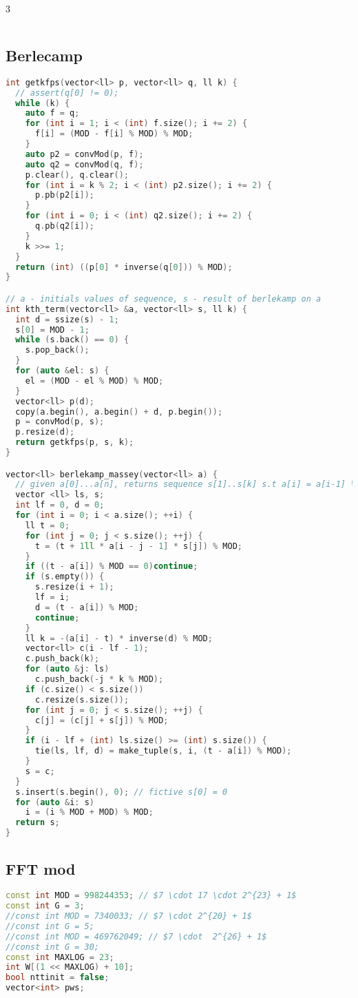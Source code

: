 \documentclass[9pt,a4paper,landscape,twosided]{extarticle}
\begin{document}
\begin{multicols*}{3}
\begin{lstlisting}[language=C++]
\end{lstlisting}

\subsection{Berlecamp}
\begin{lstlisting}[language=C++]
int getkfps(vector<ll> p, vector<ll> q, ll k) {
  // assert(q[0] != 0);
  while (k) {
    auto f = q;
    for (int i = 1; i < (int) f.size(); i += 2) {
      f[i] = (MOD - f[i] % MOD) % MOD;
    }
    auto p2 = convMod(p, f);
    auto q2 = convMod(q, f);
    p.clear(), q.clear();
    for (int i = k % 2; i < (int) p2.size(); i += 2) {
      p.pb(p2[i]);
    }
    for (int i = 0; i < (int) q2.size(); i += 2) {
      q.pb(q2[i]);
    }
    k >>= 1;
  }
  return (int) ((p[0] * inverse(q[0])) % MOD);
}

// a - initials values of sequence, s - result of berlekamp on a
int kth_term(vector<ll> &a, vector<ll> s, ll k) {
  int d = ssize(s) - 1;
  s[0] = MOD - 1;
  while (s.back() == 0) {
    s.pop_back();
  }
  for (auto &el: s) {
    el = (MOD - el % MOD) % MOD;
  }
  vector<ll> p(d);
  copy(a.begin(), a.begin() + d, p.begin());
  p = convMod(p, s);
  p.resize(d);
  return getkfps(p, s, k);
}

vector<ll> berlekamp_massey(vector<ll> a) {
  // given a[0]...a[n], returns sequence s[1]..s[k] s.t a[i] = a[i-1] \cdot s[1] + \ldots + a[i-k] \cdot s[k]
  vector <ll> ls, s;
  int lf = 0, d = 0;
  for (int i = 0; i < a.size(); ++i) {
    ll t = 0;
    for (int j = 0; j < s.size(); ++j) {
      t = (t + 1ll * a[i - j - 1] * s[j]) % MOD;
    }
    if ((t - a[i]) % MOD == 0)continue;
    if (s.empty()) {
      s.resize(i + 1);
      lf = i;
      d = (t - a[i]) % MOD;
      continue;
    }
    ll k = -(a[i] - t) * inverse(d) % MOD;
    vector<ll> c(i - lf - 1);
    c.push_back(k);
    for (auto &j: ls)
      c.push_back(-j * k % MOD);
    if (c.size() < s.size())
      c.resize(s.size());
    for (int j = 0; j < s.size(); ++j) {
      c[j] = (c[j] + s[j]) % MOD;
    }
    if (i - lf + (int) ls.size() >= (int) s.size()) {
      tie(ls, lf, d) = make_tuple(s, i, (t - a[i]) % MOD);
    }
    s = c;
  }
  s.insert(s.begin(), 0); // fictive s[0] = 0
  for (auto &i: s)
    i = (i % MOD + MOD) % MOD;
  return s;
}
\end{lstlisting}

\subsection{FFT mod}
\begin{lstlisting}[language=C++]
const int MOD = 998244353; // $7 \cdot 17 \cdot 2^{23} + 1$
const int G = 3;
//const int MOD = 7340033; // $7 \cdot 2^{20} + 1$
//const int G = 5;
//const int MOD = 469762049; // $7 \cdot  2^{26} + 1$
//const int G = 30;
const int MAXLOG = 23;
int W[(1 << MAXLOG) + 10];
bool nttinit = false;
vector<int> pws;


\end{lstlisting}
\end{multicols*}
\end{document}
